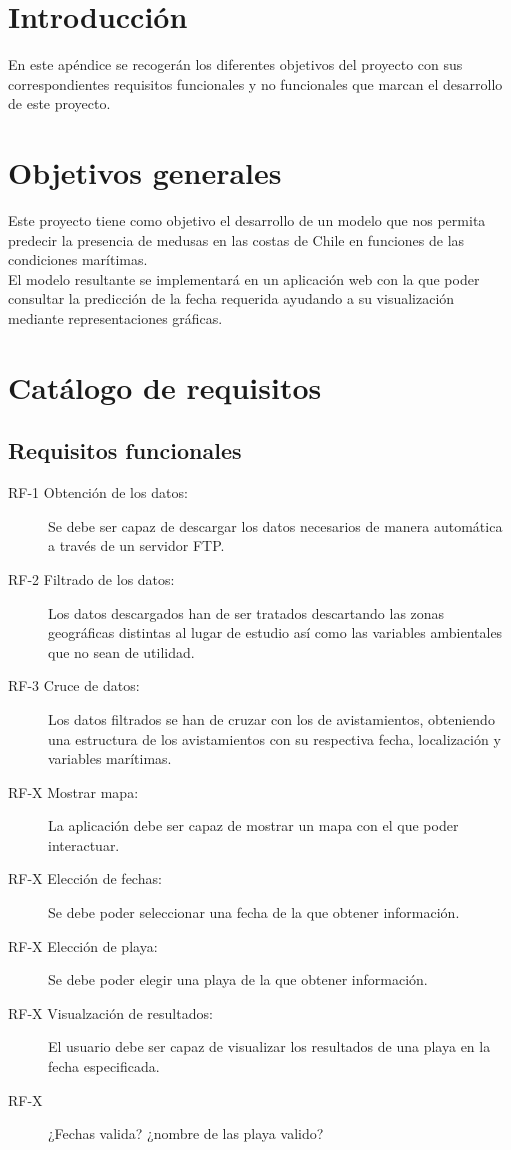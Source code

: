 
\section{Introducción}
En este apéndice se recogerán los diferentes objetivos del proyecto con sus correspondientes requisitos funcionales y no funcionales que marcan el desarrollo de este proyecto.

\section{Objetivos generales}

Este proyecto tiene como objetivo el desarrollo de un modelo que nos permita predecir la presencia de medusas en las costas de Chile en funciones de las condiciones marítimas.\\
El modelo resultante se implementará en un aplicación web con la que poder consultar la predicción de la fecha requerida ayudando a su visualización mediante representaciones gráficas.

\section{Catálogo de requisitos}

	\subsection{Requisitos funcionales}

\begin{description}
	\item[RF-1 Obtención de los datos:] Se debe ser capaz de descargar los datos necesarios de manera automática a través de un servidor FTP.
	\item[RF-2 Filtrado de los datos:] Los datos descargados han de ser tratados descartando las zonas geográficas distintas al lugar de estudio así como las variables ambientales que no sean de utilidad.
	\item[RF-3 Cruce de datos:] Los datos filtrados se han de cruzar con los de avistamientos, obteniendo una estructura de los avistamientos con su respectiva fecha, localización y variables marítimas.
	
	\item[RF-X Mostrar mapa:] La aplicación debe ser capaz de mostrar un mapa con el que poder interactuar.
	\item[RF-X Elección de fechas:] Se debe poder seleccionar una fecha de la que obtener información.
	\item[RF-X Elección de playa:] Se debe poder elegir una playa de la que obtener información.
	\item[RF-X Visualzación de resultados:] El usuario debe ser capaz de visualizar los resultados de una playa en la fecha especificada.
	\item[RF-X] ¿Fechas valida? ¿nombre de las playa valido?
	
\end{description}

